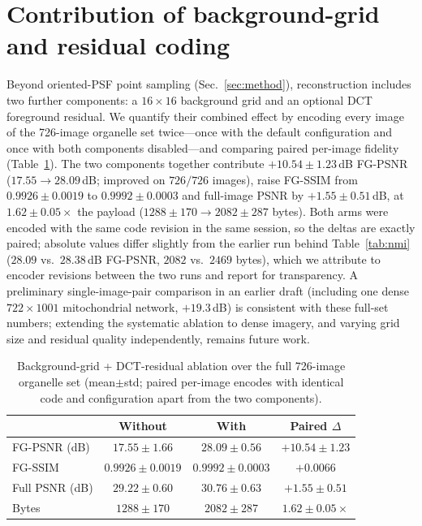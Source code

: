 \documentclass[10pt,a4paper]{article}
\begin{document}
\section{Contribution of background-grid and residual coding}\label{sec:ablation}
Beyond oriented-PSF point sampling (Sec.~\ref{sec:method}), reconstruction
includes two further components: a $16\times16$ background grid and an
optional DCT foreground residual. We quantify their combined effect by
encoding every image of the 726-image organelle set twice---once with the
default configuration and once with both components disabled---and comparing
paired per-image fidelity (Table~\ref{tab:ablation}). The two components
together contribute $+10.54\pm1.23$\,dB FG-PSNR ($17.55\to28.09$\,dB;
improved on $726/726$ images), raise FG-SSIM from $0.9926\pm0.0019$ to
$0.9992\pm0.0003$ and full-image PSNR by $+1.55\pm0.51$\,dB, at
$1.62\pm0.05\times$ the payload ($1288\pm170\to2082\pm287$ bytes). Both
arms were encoded with the same code revision in the same session, so the
deltas are exactly paired; absolute values differ slightly from the earlier
run behind Table~\ref{tab:nmi} ($28.09$ vs.\ $28.38$\,dB FG-PSNR,
$2082$ vs.\ $2469$ bytes), which we attribute to encoder revisions between
the two runs and report for transparency. A preliminary single-image-pair
comparison in an earlier draft (including one dense $722\times1001$
mitochondrial network, $+19.3$\,dB) is consistent with these full-set
numbers; extending the systematic ablation to dense imagery, and varying
grid size and residual quality independently, remains future work.

\begin{table}[t]
\centering
\caption{Background-grid + DCT-residual ablation over the full 726-image
organelle set (mean$\pm$std; paired per-image encodes with identical code
and configuration apart from the two components).}
\label{tab:ablation}
\footnotesize
\begin{tabular}{lccc}
\toprule
 & Without & With & Paired $\Delta$\\
\midrule
FG-PSNR (dB)   & $17.55\pm1.66$ & $28.09\pm0.56$ & $+10.54\pm1.23$\\
FG-SSIM        & $0.9926\pm0.0019$ & $0.9992\pm0.0003$ & $+0.0066$\\
Full PSNR (dB) & $29.22\pm0.60$ & $30.76\pm0.63$ & $+1.55\pm0.51$\\
Bytes          & $1288\pm170$ & $2082\pm287$ & $1.62\pm0.05\times$\\
\bottomrule
\end{tabular}
\end{table}
\end{document}
